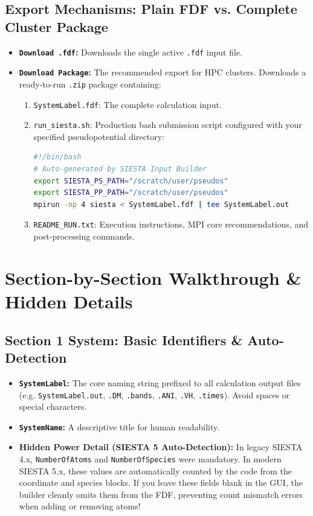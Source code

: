 \documentclass[11pt,a4paper]{article}
\begin{document}
\subsection{Export Mechanisms: Plain FDF vs. Complete Cluster Package}
\begin{itemize}[leftmargin=*]
 \item \textbf{\texttt{Download .fdf}:} Downloads the single active \texttt{.fdf} input file.
 \item \textbf{\texttt{Download Package}:} The recommended export for HPC clusters. Downloads a ready-to-run \texttt{.zip} package containing:
 \begin{enumerate}
 \item \texttt{SystemLabel.fdf}: The complete calculation input.
 \item \texttt{run\_siesta.sh}: Production bash submission script configured with your specified pseudopotential directory:
\begin{lstlisting}[language=bash]
#!/bin/bash
# Auto-generated by SIESTA Input Builder
export SIESTA_PS_PATH="/scratch/user/pseudos"
export SIESTA_PP_PATH="/scratch/user/pseudos"
mpirun -np 4 siesta < SystemLabel.fdf | tee SystemLabel.out
\end{lstlisting}
 \item \texttt{README\_RUN.txt}: Execution instructions, MPI core recommendations, and post-processing commands.
 \end{enumerate}
\end{itemize}

\newpage
\section{Section-by-Section Walkthrough \& Hidden Details}

\subsection{Section 1 System: Basic Identifiers \& Auto-Detection}
\begin{itemize}[leftmargin=*]
 \item \textbf{\texttt{SystemLabel}:} The core naming string prefixed to all calculation output files (e.g. \texttt{SystemLabel.out}, \texttt{.DM}, \texttt{.bands}, \texttt{.ANI}, \texttt{.VH}, \texttt{.times}). Avoid spaces or special characters.
 \item \textbf{\texttt{SystemName}:} A descriptive title for human readability.
 \item \textbf{Hidden Power Detail (SIESTA 5 Auto-Detection):} In legacy SIESTA 4.x, \texttt{NumberOfAtoms} and \texttt{NumberOfSpecies} were mandatory. In modern SIESTA 5.x, these values are automatically counted by the code from the coordinate and species blocks. If you leave these fields blank in the GUI, the builder cleanly omits them from the FDF, preventing count mismatch errors when adding or removing atoms!
\end{itemize}
\end{document}
